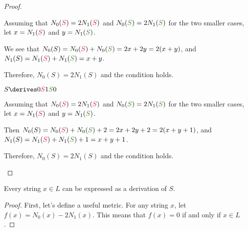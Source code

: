\begin{problem}
\begin{enumalph}
\begin{Answer}
\begin{claim}
\begin{proof}
\begin{enumroman}
                \step
                Assuming that $N_0(\crim{S}) = 2N_1(\crim{S})$ and
                $N_0(\green{S}) = 2N_1(\green{S})$ for the two smaller cases,\\
                let $x = N_1(\crim{S})$ and $y = N_1(\green{S})$.

                \step
                We see that $N_0(S) = N_0(\crim{S}) + N_0(\green{S}) = 2x + 2y = 2(x + y)$,
                and $N_1(S) = N_1(\crim{S}) + N_1(\green{S}) = x + y$.

                \step
                Therefore, $N_0(S) = 2N_1(S)$ and the condition holds.
              \item $S \derives 0\crim{S}1\green{S}0$
              
                \step
                Assuming that $N_0(\crim{S}) = 2N_1(\crim{S})$ and
                $N_0(\green{S}) = 2N_1(\green{S})$ for the two smaller cases,\\
                let $x = N_1(\crim{S})$ and $y = N_1(\green{S})$.

                \step
                Then $N_0(S) = N_0(\crim{S}) + N_0(\green{S}) + 2 = 2x + 2y + 2 = 2(x + y + 1)$,
                and $N_1(S) = N_1(\crim{S}) + N_1(\green{S}) + 1 = x + y + 1$.

                \step
                Therefore, $N_0(S) = 2N_1(S)$ and the condition holds.
            \end{enumroman}
          \end{proof}
        \end{claim}
        \begin{claim}
          Every string $x \in L$ can be expressed as a derivation of $S$.

          \begin{proof}

            \step
            First, let's define a useful metric.
            For any string $x$, let $f(x) = N_0(x) - 2N_1(x)$.
            This means that $f(x) = 0$ if and only if $x \in L$.


\end{proof}
\end{claim}
\end{Answer}
\end{enumalph}
\end{problem}
